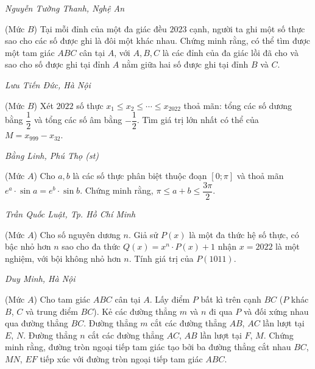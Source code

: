 \begin{multicols}{2}
	\begin{flushright}
		\textit{Nguyễn Tường Thanh, Nghệ An}
	\end{flushright}
	{}
	(Mức $B$) Tại mỗi đỉnh của một đa giác đều $2023$ cạnh, người ta ghi một số thực sao cho các số được ghi là đôi một khác nhau. Chứng minh rằng, có thể tìm được một tam giác $ABC$ cân tại $A$, với $A,B,C$ là các đỉnh của đa giác lồi đã cho và sao cho số được ghi tại đỉnh $A$ nằm giữa hai số được ghi tại đỉnh $B$ và $C$. 
	\begin{flushright}
		\textit{Lưu Tiến Đức, Hà Nội}
	\end{flushright}
	{}
	(Mức $B$) Xét $2022$ số thực $x_1\leq x_2\leq \cdots\leq x_{2022}$ thoả mãn: tổng các số dương bằng $\dfrac12$ và tổng các số âm bằng $-\dfrac12$. Tìm giá trị lớn nhất có thể của $M=x_{999}-x_{32}$. 
	\begin{flushright}
		\textit{Bằng Linh, Phú Thọ (st)}
	\end{flushright}
	{}
	(Mức $A$) Cho $a,b$ là các số thực phân biệt thuộc đoạn $[0;\pi]$ và thoả mãn $e^a\cdot\sin a=e^b\cdot\sin b$. Chứng minh rằng, \linebreak$\pi\leq a+b\leq \dfrac{3\pi}2$. 
	\begin{flushright}
		\textit{Trần Quốc Luật, Tp. Hồ Chí Minh}
	\end{flushright}
	{}
	(Mức $A$) Cho số nguyên dương $n$. Giả sử $P(x)$ là một đa thức hệ số thực, có bậc nhỏ hơn $n$ sao cho đa thức $Q(x)=x^n\cdot P(x)+1$ nhận $x=2022$ là một nghiệm, với bội không nhỏ hơn $n$. Tính giá trị của $P(1011)$.
	\begin{flushright}
		\textit{Duy Minh, Hà Nội}
	\end{flushright}
	{}
	(Mức $A$) Cho tam giác $A B C$ cân tại $A$. Lấy điểm $P$ bất kì trên cạnh $B C$ ($P$ khác $B$, $C$ và trung điểm $BC$). Kẻ các đường thẳng $m$ và $n$  đi qua $P$ và đối xứng nhau qua đường thẳng $BC$. Đường thẳng $m$ cắt các đường thẳng $A B$, $A C$ lần lượt tại $E$, $N$. Đường thẳng $n$ cắt các đường thẳng $A C$, $A B$ lần lượt tại $F$, $M$. Chứng minh rằng, đường tròn ngoại tiếp tam giác tạo bởi ba đường thẳng cắt nhau $B C$,  $M N$, $E F$ tiếp xúc với đường tròn ngoại tiếp tam giác $A B C$.
	\begin{center}

\end{center}
\end{multicols}
